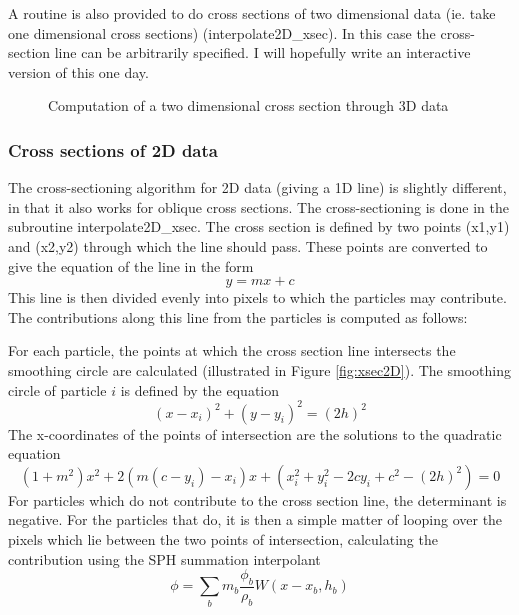 \documentclass[a4paper,12pt]{article}
\begin{document}
 A routine is also provided to do cross sections of two dimensional data (ie. take one dimensional
cross sections) (interpolate2D\_xsec). In this case the cross-section line can be arbitrarily
specified. I will hopefully write an interactive version of this one day.
\begin{figure}
\begin{center}
\caption{Computation of a two dimensional cross section through 3D data}
\label{fig:xsec3D}
\end{center}
\end{figure}


\subsubsection{Cross sections of 2D data}
The cross-sectioning algorithm for 2D data (giving a 1D line) is slightly
different, in that it also works for oblique cross sections. The
cross-sectioning is done in the subroutine interpolate2D\_xsec. The cross
section is defined by two points (x1,y1) and (x2,y2) through which the line
should pass. These points are converted to give the equation of the line in the
form
\begin{equation}
y = mx + c
\end{equation}
This line is then divided evenly into pixels to which the particles
may contribute. The contributions along this line from the particles is computed
as follows: 

 For each particle, the points at which the cross section line intersects the
smoothing circle are calculated (illustrated in Figure \ref{fig:xsec2D}). The
smoothing circle of particle $i$ is defined by the equation
\begin{equation}
(x-x_i)^2 + (y-y_i)^2 = (2h)^2
\end{equation}
The x-coordinates of the points of intersection are the solutions to the quadratic equation
\begin{equation}
(1 + m^2) x^2 + 2 (m (c - y_i) - x_i) x + (x_i^2 + y_i^2 - 2cy_i + c^2 - (2h)^2)= 0
\end{equation}
For particles which do not contribute to the cross section line, the determinant
is negative. For the particles that do, it is then a simple matter of looping
over the pixels which lie between the two points of intersection, calculating
the contribution using the SPH summation interpolant
\begin{equation}
\phi = \sum_b m_b \frac{\phi_b}{\rho_b} W(x - x_b, h_b)
\end{equation}
\end{document}
